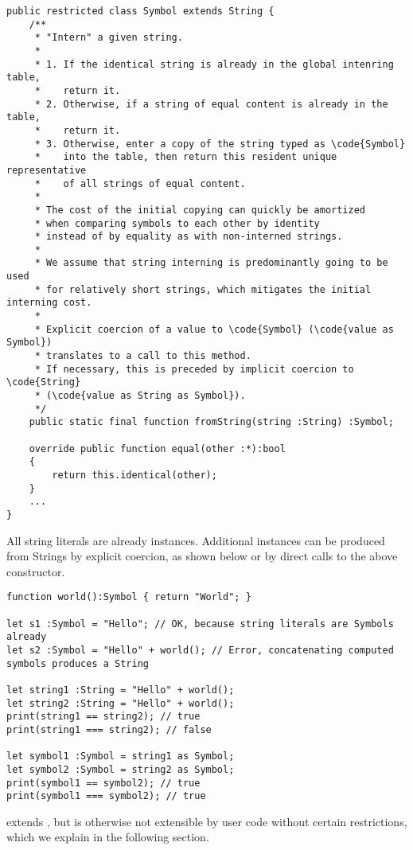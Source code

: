 \begin{verbatim}
public restricted class Symbol extends String {
    /**
     * "Intern" a given string.
     *
     * 1. If the identical string is already in the global intenring table,
     *    return it.
     * 2. Otherwise, if a string of equal content is already in the table,
     *    return it.
     * 3. Otherwise, enter a copy of the string typed as \code{Symbol}
     *    into the table, then return this resident unique representative
     *    of all strings of equal content.
     *
     * The cost of the initial copying can quickly be amortized
     * when comparing symbols to each other by identity
     * instead of by equality as with non-interned strings.
     *
     * We assume that string interning is predominantly going to be used
     * for relatively short strings, which mitigates the initial interning cost.
     *
     * Explicit coercion of a value to \code{Symbol} (\code{value as Symbol})
     * translates to a call to this method.
     * If necessary, this is preceded by implicit coercion to \code{String}
     * (\code{value as String as Symbol}).
     */
    public static final function fromString(string :String) :Symbol;

    override public function equal(other :*):bool
    {
        return this.identical(other);
    }
    ...
}
\end{verbatim}
All string literals are already  instances. Additional
 instances can be produced from Strings by explicit coercion,
as shown below or by direct calls to the above constructor.

\begin{verbatim}
function world():Symbol { return "World"; }

let s1 :Symbol = "Hello"; // OK, because string literals are Symbols already
let s2 :Symbol = "Hello" + world(); // Error, concatenating computed symbols produces a String

let string1 :String = "Hello" + world();
let string2 :String = "Hello" + world();
print(string1 == string2); // true
print(string1 === string2); // false

let symbol1 :Symbol = string1 as Symbol;
let symbol2 :Symbol = string2 as Symbol;
print(symbol1 == symbol2); // true
print(symbol1 === symbol2); // true
\end{verbatim}

 extends , but  is otherwise not
extensible by user code without certain restrictions, which we explain in the
following section.


